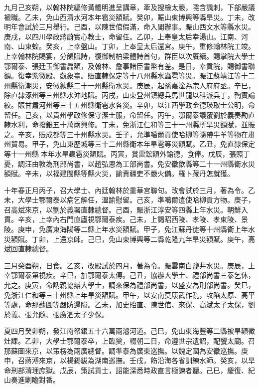\begin{pinyinscope}
九月己亥朔，以翰林院編修黃體明進呈講章，牽及搜檢太嚴，隱含諷刺，下部嚴議褫職。乙未，免山西清水河本年雹災額賦。癸卯，賑山東博興等縣旱災。丁未，改明年會試於三月舉行。己酉，以陳世倌假滿，命入閣辦事。賑山西文水等縣水災。庚戌，以四川學政蔣蔚實心教士，命留任。乙卯，上奉皇太后幸湯山。江南、河南、山東蝗。癸亥，上幸盤山。丁卯，上奉皇太后還宮。庚午，重修翰林院工竣。上幸翰林院賜宴，分韻賦詩，復御制柏梁體詩首句，群臣以次賡續。賜掌院大學士鄂爾泰、張廷玉御書扁額，及翰林、詹事諸臣書幣有差。是日，幸貢院，賜御書聯額。復幸紫微殿、觀象臺。賑直隸保定等十八州縣水蟲雹等災。賑江蘇靖江等十二州縣衛潮災，安徽歙縣二十一州縣衛水災。庚辰，起孫嘉淦為宗人府府丞。辛巳，除直隸涿州等三州縣水沖地賦。丙戌，山東登州鎮總兵馬世龍以科派兵丁，鞫實論絞。賑甘肅河州等三十五州縣衛雹水各災。辛卯，以江西學政金德瑛取士公明，命留任。己亥，以貴州學政佟保守潔士服，命留任。丙午，鄂爾泰議覆劉於義奏勘直隸水利，命撥銀五十萬兩興修。丁未，免浙江仁和等三十一州縣所旱災額賦，並賑之。辛亥，賑成都等三十州縣水災。壬子，允準噶爾貢使哈柳等隨帶牛羊等物在肅州貿易。甲子，免山東歷城等三十二州縣衛本年旱雹等災額賦。乙丑，免直隸保定等十一州縣本年水旱蟲雹災額賦。丙寅，賞雷鋐額外諭德，食俸。戊辰，張照丁憂，調汪由敦為刑部尚書，以趙弘恩為工部尚書。免安徽歙縣等二十一州縣衛水災額賦。辛未，以福建閩縣等縣火災，諭責疆吏不嚴火備。羅卜藏丹怎就獲。

十年春正月丙子，召大學士、內廷翰林於重華宮聯句。改會試於三月，著為令。乙未，大學士鄂爾泰以病乞解任，溫諭慰留。己亥，準噶爾遣使哈柳貢方物。庚子，召高斌來京，以劉於義署直隸總督。己酉，賑浙江淳安等四縣上年水災。朝鮮入貢。辛亥，上幸內右門直廬視鄂爾泰疾。己未，上謁昭西陵、孝陵、孝東陵、景陵。庚申，免廣東海陽等二縣上年水災額賦。甲子，免江蘇丹徒等十州縣衛上年水災額賦。丁卯，上還京師。己巳，免山東博興等二縣乾隆九年旱災額賦。庚午，高斌回直隸總督。

三月癸酉朔，日食。乙亥，改殿試於四月，著為令。賑雲南白鹽井水災。庚辰，上幸鄂爾泰第視疾。辛巳，加鄂爾泰太傅。己丑，協辦大學士、禮部尚書三泰乞休，允之。庚寅，命訥親協辦大學士，調來保為禮部尚書，以盛安為刑部尚書。癸巳，免浙江仁和等三十州縣上年旱災額賦。甲午，以安南莫康武作亂，攻陷太原、高平等處，命那蘇圖等嚴防邊隘。乙未，加史貽直、陳世倌、來保、高斌太子太保，劉於義、張允隨、張廣泗太子少保。

夏四月癸卯朔，發江南帑銀五十六萬兩濬河道。己巳，免山東海豐等二縣被旱額徵灶課。乙卯，大學士鄂爾泰卒，上臨奠，輟朝二日，命遵世宗遺詔，配饗太廟。召那蘇圖來京，以策楞為兩廣總督。調準泰為廣東巡撫。以魏定國為安徽巡撫。庚申，召蔣溥來京，以楊錫紱為湖南巡撫。壬戌，飭沿海各省訓練水師。癸亥，以旱命刑部清理庶獄。戊辰，策試貢士，詔能深悉時政直言極諫者聽。己巳，慶復、紀山奏進剿瞻對番。


\end{pinyinscope}

